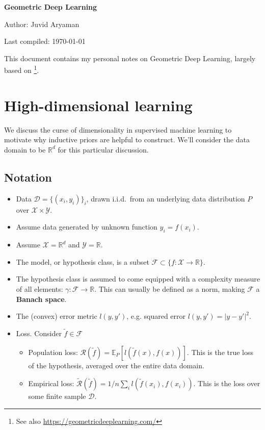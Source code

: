 \documentclass[11pt]{article}
\numberwithin{equation}{section}
\begin{document}
\begin{flushleft}
\textbf{\Large Geometric Deep Learning}
\end{flushleft}

\begin{flushleft}
Author: Juvid Aryaman

Last compiled: \today
\end{flushleft}

\noindent This document contains my personal notes on Geometric Deep Learning, largely based on \cite{Bronstein21}\footnote{See also \url{https://geometricdeeplearning.com/}}.

\section{High-dimensional learning}

We discuss the curse of dimensionality in supervised machine learning to motivate why inductive priors are helpful to construct. We'll consider the data domain to be $\mathbb{R}^d$ for this particular discussion.

\subsection{Notation}

\newcommand{\eloss}{\tilde{\mathcal{R}}}
\newcommand{\ploss}{\mathcal{R}}
\newcommand{\hypclass}{\mathcal{F}}

\begin{itemize}[noitemsep]
\item Data $\mathcal{D} = \{(x_i, y_i)\}_i$, drawn i.i.d.\ from an underlying data distribution $P$ over $\mathcal{X} \times \mathcal{Y}$.
\item Assume data generated by unknown function $y_i = f(x_i)$.
\item Assume $\mathcal{X} = \mathbb{R}^d$ and $\mathcal{Y} = \mathbb{R}$.
\item The model, or hypothesis class, is a subset $\hypclass \subset \{f: \mathcal{X} \rightarrow \mathbb{R} \}$.
\item The hypothesis class is assumed to come equipped with a complexity measure of all elements: $\gamma: \hypclass \rightarrow \mathbb{R}$. This can usually be defined as a norm, making $\mathcal{F}$ a \textbf{Banach space}.
\item The (convex) error metric $l(y, y')$, e.g. squared error $l(y,y')=|y-y'|^2$.
\item Loss. Consider $\tilde{f} \in \mathcal{F}$
	\begin{itemize}[noitemsep]
	\item Population loss: $\ploss(\tilde{f}) = \mathbb{E}_P[l(\tilde{f}(x), f(x))]$. This is the true loss of the hypothesis, averaged over the entire data domain.
	\item Empirical loss: $\eloss(\tilde{f}) = 1/n \sum_i l(\tilde{f}(x_i), f(x_i))$. This is the loss over some finite sample $\mathcal{D}$.
	\end{itemize}
\end{itemize}
\end{document}

